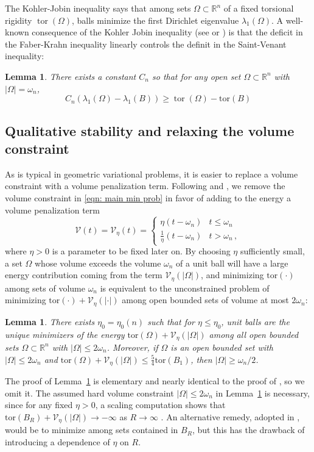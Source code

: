 \documentclass[10pt,a4paper]{amsart}
\numberwithin{equation}{section}
\newtheorem{lemma}[theorem]{Lemma}
\def\R{{\mathbb R}}
\def\w{\omega}
\def\W{\Omega}
\def\om{\omega}
\def\tor{\mathrm{tor}}
\def\vpar{\eta}
\def\fv{\mathscr{V}_{\vpar}}
\begin{document}
The Kohler-Jobin inequality \cite{KJ1, KJ2, KJ3}
says that among sets $\Omega \subset \mathbb{R}^n$ of a fixed torsional rigidity $\operatorname{tor}(\Omega)$, balls minimize the first Dirichlet eigenvalue $\lambda_1(\Omega)$. 
A well-known consequence of the Kohler Jobin inequality (see \cite[Cor. 3.18]{AKN1} or \cite[Prop. 2.1]{BDV15}) is that the deficit in the Faber-Krahn inequality linearly controls the definit in the Saint-Venant inequality:
\begin{lemma}\label{lem: KJ consequence}
 There exists a constant $C_n$ so that for any open set $\W\subset \R^n$ with $|\W|=\om_n$, 
\[
C_n\left(\lambda_1(\Omega)-\lambda_1(B)\right) \geq \operatorname{tor}(\Omega)-\tor(B)
\]
\end{lemma}


%
%
\subsection{Qualitative stability and relaxing the volume constraint}\label{ssec: qual stab}
As is typical in geometric variational problems, it is easier to replace a volume constraint with a volume penalization term. 
Following \cite{aac86} and \cite{BDV15}, we remove the volume constraint in \eqref{eqn: main min prob} in favor of adding to the energy a volume penalization term
\begin{equation} \label{eqn: def vol penalization fixed param}
	\mathscr{V}(t)=\fv(t) = \begin{cases}
		\vpar (t - \om_n) & t \leq \om_n\\
		\frac{1}{\vpar}(t - \om_n) & t > \om_n\,,
	\end{cases}
\end{equation}
where $\vpar>0$ is a parameter to be fixed later on.
By choosing  $\vpar$ sufficiently small, a set $\W$ whose volume exceeds the volume $\om_n$ of a unit ball will have a large energy contribution coming from the term $\fv(|\W|)$, and minimizing $\tor(\cdot)$ among sets of volume $\w_n$ is equivalent to the unconstrained problem of minimizing $\tor(\cdot)  + \fv(|\cdot|)$ among open bounded sets of volume at most $2\omega_n$:
\begin{lemma}
    \label{prop: base summary}
 There exists $\vpar_0 = \vpar_0(n)$ such that for $\vpar \leq \vpar_0$,  unit balls are the unique minimizers of the energy $\tor(\W)  + \fv(|\W|)$ among all open bounded sets $ \W \subset \R^n$ with $|\W | \leq 2 \omega_n$.
 Moreover, if $\W$ is an open bounded set with $|\W | \leq 2 \omega_n$ and  $\tor(\W)  + \fv(|\W|) \leq \frac{5}{4}\tor(B_1)$, then $|\W| \geq \omega_n/2$.
\end{lemma} 
The proof of Lemma~\ref{prop: base summary} is elementary and nearly identical to the proof of \cite[Lemma 4.5]{BDV15}, so we omit it.
%
The assumed hard volume constraint $|\W| \leq2 \om_n$ in Lemma~\ref{prop: base summary} is necessary, since for any fixed $\eta >0$,  a scaling computation shows that  $\tor(B_R) + \fv(|\W|) \to -\infty$ as $R \to \infty$ .  An alternative remedy, adopted in \cite{BDV15}, would be to minimize among sets contained in $B_R$, but this has the drawback of introducing a dependence of $\eta$ on $R$.
 
\end{document}
